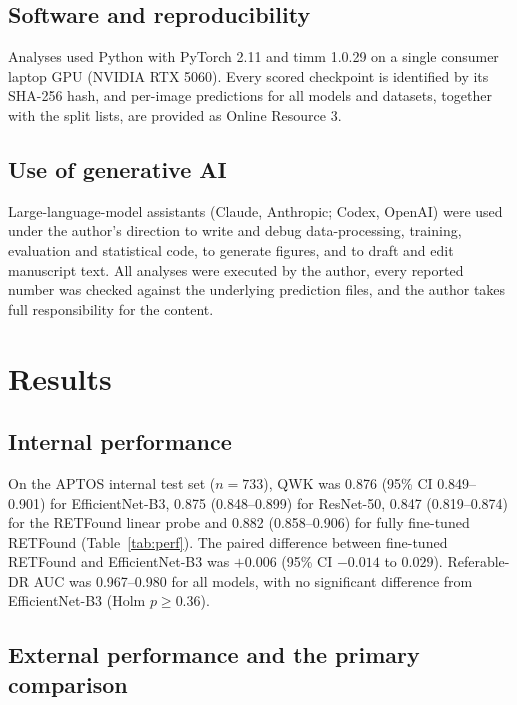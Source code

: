 \documentclass[pdflatex,sn-basic,Numbered]{sn-jnl}
\begin{document}
\subsection{Software and reproducibility}

Analyses used Python with PyTorch 2.11 and timm 1.0.29 on a single consumer laptop GPU (NVIDIA RTX 5060). Every scored checkpoint is identified by its SHA-256 hash, and per-image predictions for all models and datasets, together with the split lists, are provided as Online Resource 3.

\subsection{Use of generative AI}

Large-language-model assistants (Claude, Anthropic; Codex, OpenAI) were used under the author's direction to write and debug data-processing, training, evaluation and statistical code, to generate figures, and to draft and edit manuscript text. All analyses were executed by the author, every reported number was checked against the underlying prediction files, and the author takes full responsibility for the content.

\section{Results}\label{sec:results}

\subsection{Internal performance}

On the APTOS internal test set ($n=733$), QWK was 0.876 (95\% CI 0.849--0.901) for EfficientNet-B3, 0.875 (0.848--0.899) for ResNet-50, 0.847 (0.819--0.874) for the RETFound linear probe and 0.882 (0.858--0.906) for fully fine-tuned RETFound (Table~\ref{tab:perf}). The paired difference between fine-tuned RETFound and EfficientNet-B3 was $+0.006$ (95\% CI $-0.014$ to $0.029$). Referable-DR AUC was 0.967--0.980 for all models, with no significant difference from EfficientNet-B3 (Holm $p\ge0.36$).

\subsection{External performance and the primary comparison}
\end{document}
